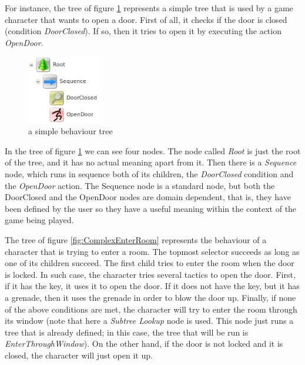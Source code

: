 \documentclass[a4paper]{article}
\begin{document}
For instance, the tree of figure \ref{fig:SimpleOpenDoor} represents a simple tree that is used by a game character that wants to open a door. First of all, it checks if the door is closed (condition \textit{DoorClosed}). If so, then it tries to open it by executing the action \textit{OpenDoor}.

\begin{figure}
 \centering
 \includegraphics[width=0.3\textwidth]{./Images/SimpleOpenDoor.png}
 \caption{a simple behaviour tree}
 \label{fig:SimpleOpenDoor}
\end{figure}

In the tree of figure \ref{fig:SimpleOpenDoor} we can see four nodes. The node called \textit{Root} is just the root of the tree, and it has no actual meaning apart from it. Then there is a \textit{Sequence} node, which runs in sequence both of its children, the \textit{DoorClosed} condition and the \textit{OpenDoor} action. The Sequence node is a standard node, but both the DoorClosed and the OpenDoor nodes are domain dependent, that is, they have been defined by the user so they have a useful meaning within the context of the game being played.

The tree of figure \ref{fig:ComplexEnterRoom} represents the behaviour of a character that is trying to enter a room. The topmost selector succeeds as long as one of its children succeed. The first child tries to enter the room when the door is locked. In such case, the character tries several tactics to open the door. First, if it has the key, it uses it to open the door. If it does not have the key, but it has a grenade, then it uses the grenade in order to blow the door up. Finally, if none of the above conditions are met, the character will try to enter the room through its window (note that here a \textit{Subtree Lookup} node is used. This node just runs a tree that is already defined; in this case, the tree that will be run is \textit{EnterThroughWindow}). On the other hand, if the door is not locked and it is closed, the character will just open it up. 
\end{document}
